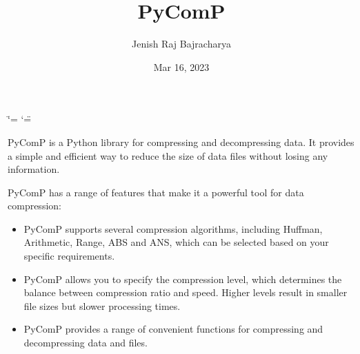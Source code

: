 \documentclass[letterpaper,10pt,english]{sphinxmanual}
\title{PyComP}
\date{Mar 16, 2023}
\author{Jenish Raj Bajracharya}
\begin{document}
\ifdefined\shorthandoff
  \ifnum\catcode`\=\string=\active\shorthandoff{=}\fi
  \ifnum\catcode`\"=\active{}\fi
\fi

\pagestyle{empty}
\sphinxmaketitle
\pagestyle{plain}
\sphinxtableofcontents
\pagestyle{normal}
\label{\detokenize{index::doc}}


\sphinxAtStartPar
PyComP is a Python library for compressing and decompressing data. It provides a simple and efficient way to reduce the size of data files without losing any information.

\sphinxAtStartPar
{}

\sphinxAtStartPar
PyComP has a range of features that make it a powerful tool for data compression:
\begin{itemize}
\item {} 
\sphinxAtStartPar
{} PyComP supports several compression algorithms, including Huffman, Arithmetic, Range, ABS and ANS, which can be selected based on your specific requirements.

\item {} 
\sphinxAtStartPar
{} PyComP allows you to specify the compression level, which determines the balance between compression ratio and speed. Higher levels result in smaller file sizes but slower processing times.

\item {} 
\sphinxAtStartPar
{} PyComP provides a range of convenient functions for compressing and decompressing data and files.

\end{itemize}

\sphinxAtStartPar
{}
\end{document}
